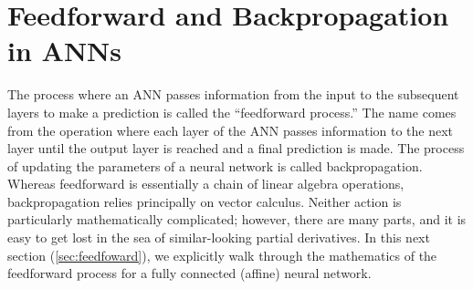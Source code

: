 \section{Feedforward and Backpropagation in ANNs}

The process where an ANN passes information from the input to the subsequent layers to make a prediction is called the ``feedforward process.'' The name comes from the operation where each layer of the ANN passes information to the next layer until the output layer is reached and a final prediction is made. The process of updating the parameters of a neural network is called backpropagation. Whereas feedforward is essentially a chain of linear algebra operations, backpropagation relies principally on vector calculus. Neither action is particularly mathematically complicated; however, there are many parts, and it is easy to get lost in the sea of similar-looking partial derivatives. In this next section (\ref{sec:feedfoward}), we explicitly walk through the mathematics of the feedforward process for a fully connected (affine) neural network.


